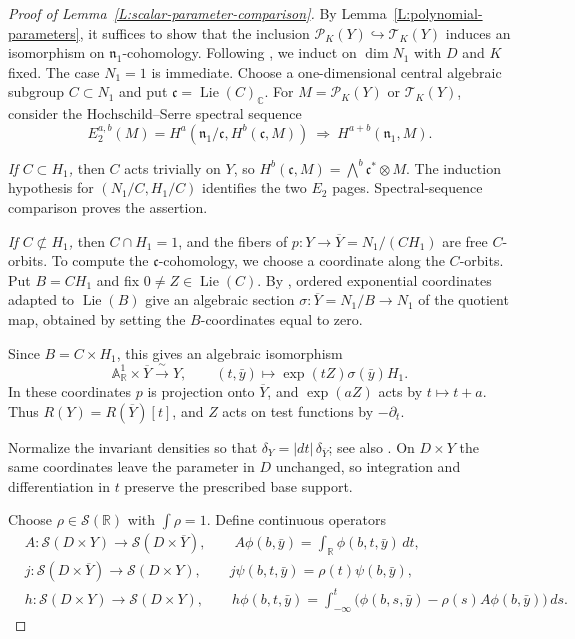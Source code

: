 \documentclass[a4paper,12pt]{amsart}
\numberwithin{equation}{section}
\theoremstyle{plain}
\theoremstyle{definition}
\theoremstyle{remark}
\begin{document}
\begin{proof}[Proof of Lemma~\ref{L:scalar-parameter-comparison}]
By Lemma~\ref{L:polynomial-parameters}, it suffices to show that the inclusion $\mathcal P_K(Y)\hookrightarrow\mathcal T_K(Y)$ induces an isomorphism on $\mathfrak n_1$-cohomology.
Following \cite[Section~4]{LLY}, we induct on $\dim N_1$ with $D$ and $K$ fixed.
The case $N_1=1$ is immediate.
Choose a one-dimensional central algebraic subgroup $C\subset N_1$ and put $\mathfrak c=\operatorname{Lie}(C)_{\mathbb C}$.
For $M=\mathcal P_K(Y)$ or $\mathcal T_K(Y)$, consider the Hochschild--Serre spectral sequence
\[
 E_2^{a,b}(M)=H^a(\mathfrak n_1/\mathfrak c,
                        H^b(\mathfrak c,M))
 \ \Longrightarrow\ H^{a+b}(\mathfrak n_1,M).
\]

\emph{If $C\subset H_1$,} then $C$ acts trivially on $Y$, so $H^b(\mathfrak c,M)=\bigwedge^b\mathfrak c^*\otimes M$.
The induction hypothesis for $(N_1/C,H_1/C)$ identifies the two $E_2$ pages.
Spectral-sequence comparison proves the assertion.

\emph{If $C\not\subset H_1$,} then $C\cap H_1=1$, and the fibers of $p:Y\to\overline Y=N_1/(CH_1)$ are free $C$-orbits.
To compute the $\mathfrak c$-cohomology, we choose a coordinate along the $C$-orbits.
Put $B=CH_1$ and fix $0\ne Z\in\operatorname{Lie}(C)$.
By \cite[Theorem~1.1.13(a) and Proposition~1.2.8]{CG90}, ordered exponential coordinates adapted to $\operatorname{Lie}(B)$ give an algebraic section $\sigma:\overline Y=N_1/B\to N_1$ of the quotient map, obtained by setting the $B$-coordinates equal to zero.

Since $B=C\times H_1$, this gives an algebraic isomorphism
\[
 \mathbb A^1_{\mathbb R}\times\overline Y\xrightarrow{\ \sim\ }Y,
 \qquad (t,\bar y)\longmapsto\exp(tZ)\sigma(\bar y)H_1.
\]
In these coordinates $p$ is projection onto $\overline Y$, and $\exp(aZ)$ acts by $t\mapsto t+a$.
Thus $R(Y)=R(\overline Y)[t]$, and $Z$ acts on test functions by $-\partial_t$.

Normalize the invariant densities so that $\delta_Y=|dt|\,\delta_{\overline Y}$; see also \cite[Lemma~4.1]{LLY}.
On $D\times Y$ the same coordinates leave the parameter in $D$ unchanged, so integration and differentiation in $t$ preserve the prescribed base support.

Choose $\rho\in\mathcal S(\mathbb R)$ with $\int\rho=1$.
Define continuous operators
\[
\begin{aligned}
 &A:\mathcal S(D\times Y)\longrightarrow\mathcal S(D\times\overline Y),\qquad
   A\phi(b,\bar y)=\int_{\mathbb R}\phi(b,t,\bar y)\,dt,\\
 &j:\mathcal S(D\times\overline Y)\longrightarrow\mathcal S(D\times Y),\qquad
   j\psi(b,t,\bar y)=\rho(t)\psi(b,\bar y),\\
 &h:\mathcal S(D\times Y)\longrightarrow\mathcal S(D\times Y),
 \qquad h\phi(b,t,\bar y)=\int_{-\infty}^{t}\bigl(\phi(b,s,\bar y)-\rho(s)A\phi(b,\bar y)\bigr)\,ds.
\end{aligned}
\]


\end{proof}
\end{document}
